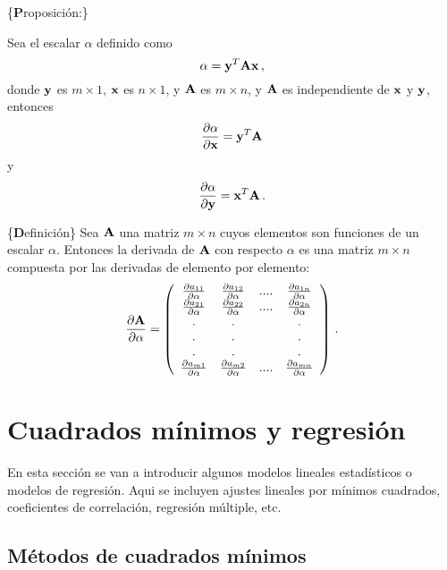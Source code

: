 \documentclass[
]{agujournal2019}
\begin{document}
\vspace{0.5cm}

\{\noindent \textbf Proposición:\}

\noindent Sea el escalar \(\alpha\) definido como
\[\alpha={\textbf y}^T{\textbf A}{\textbf x}\,,\] donde \({\textbf y}\)
es \(m\times 1\), \({\textbf x}\) es \(n\times 1\), y \({\textbf A}\) es
\(m\times n\), y \({\textbf A}\) es independiente de \({\textbf x}\) y
\({\textbf y}\), entonces
\[\frac{\partial{\alpha}}{\partial{{\textbf x}}}={\textbf y}^T{\textbf A}\]
y
\[\frac{\partial{\alpha}}{\partial{{\textbf y}}}={\textbf x}^T{\textbf A}\,.\]

\vspace{0.5cm}

\{\noindent \textbf Definición\} Sea \({\textbf A}\) una matriz
\(m\times n\) cuyos elementos son funciones de un escalar \(\alpha\).
Entonces la derivada de \({\textbf A}\) con respecto \(\alpha\) es una
matriz \(m\times n\) compuesta por las derivadas de elemento por
elemento:
\[\frac{\partial{\textbf A}}{\partial{\alpha}}=\left(\begin{array}{cccc}
  \frac{\partial{a_{11}}}{\partial{\alpha}} & \frac{\partial{a_{12}}}{\partial{\alpha}} & .... &
   \frac{\partial{a_{1n}}}{\partial{\alpha}}\\
  \frac{\partial{a_{21}}}{\partial{\alpha}} & \frac{\partial{a_{22}}}{\partial{\alpha}} & .... &
   \frac{\partial{a_{2n}}}{\partial{\alpha}}\\
    .    &   .    &      &   . \\
    .    &   .    &      &   . \\
    .    &   .    &      &   . \\
  \frac{\partial{a_{m1}}}{\partial{\alpha}} & \frac{\partial{a_{m2}}}{\partial{\alpha}} & .... &
   \frac{\partial{a_{mn}}}{\partial{\alpha}}\\
\end{array}
  \right)
\,.\]

\section {Cuadrados mínimos  y regresión}

\noindent En esta sección se van a introducir algunos modelos lineales
estadísticos o modelos de regresión. Aqui se incluyen ajustes lineales
por mínimos cuadrados, coeficientes de correlación, regresión múltiple,
etc.

\subsection{Métodos de cuadrados mínimos}
\end{document}
